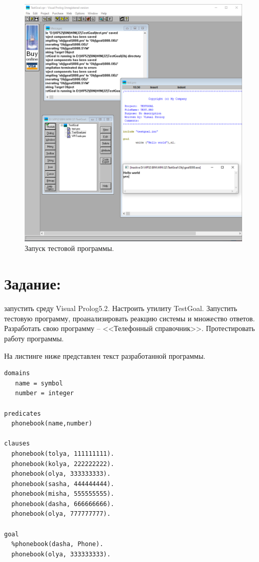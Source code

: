 \begin{figure}[H]
    \centering
    \includegraphics[scale=0.6]{data/image/gen_3.png}
    \caption{Запуск тестовой программы.}
\end{figure}

\section{Задание:}
запустить среду Visual Prolog5.2. Настроить утилиту TestGoal. Запустить тестовую программу, проанализировать реакцию системы и множество ответов. Разработать свою программу -- <<Телефонный справочник>>. Протестировать работу программы.

На листинге ниже представлен текст разработанной программы.

\lstset{language=python}
\begin{lstlisting}[caption=Текст программы]
domains
   name = symbol
   number = integer

predicates
  phonebook(name,number)

clauses
  phonebook(tolya, 111111111).
  phonebook(kolya, 222222222).
  phonebook(olya, 333333333).
  phonebook(sasha, 444444444).
  phonebook(misha, 555555555).
  phonebook(dasha, 666666666).
  phonebook(olya, 777777777).

goal
  %phonebook(dasha, Phone).
  phonebook(olya, 333333333).
\end{lstlisting}

